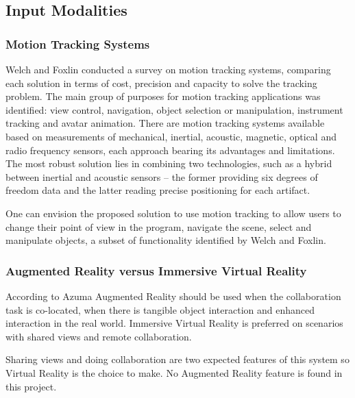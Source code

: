 \subsection{Input Modalities}

\subsubsection{Motion Tracking Systems}


Welch and Foxlin \cite{MT-BULLET} conducted a survey on motion tracking systems,
comparing each solution in terms of cost, precision and capacity to solve the tracking problem.
The main group of purposes for motion tracking applications was identified:
view control, navigation, object selection or manipulation, instrument tracking and avatar animation.
There are motion tracking systems available based on measurements of mechanical, inertial, acoustic, magnetic,
optical and radio frequency sensors, each approach bearing its advantages and limitations.
The most robust solution lies in combining two technologies,
such as a hybrid between inertial and acoustic sensors
-- the former providing six degrees of freedom data and the latter reading precise positioning for each artifact.



One can envision the proposed solution to use motion tracking to allow users to change their
point of view in the program, navigate the scene, select and manipulate objects, a subset
of functionality identified by Welch and Foxlin.

\subsubsection{Augmented Reality versus Immersive Virtual Reality}

According to Azuma \cite{OVERVIEW-AR} Augmented Reality should be used
when the collaboration task is co-located,
when there is tangible object interaction and enhanced interaction in the real world.
Immersive Virtual Reality is preferred on scenarios with shared views and
remote collaboration.


Sharing views and doing collaboration are two expected features of this system so
Virtual Reality is the choice to make. No Augmented Reality feature is found in this project.


%
